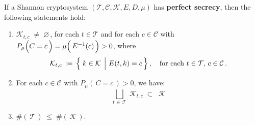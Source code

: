 \clearpage
\begin{proposition}
\mbox{}
\vskip 0.1cm
\noindent
If a Shannon cryptosystem
$(\mathcal{T},\mathcal{C},\mathcal{K},E,D,\mu)$
has \textbf{perfect secrecy}, then the following statements hold:
\begin{enumerate}
\item
	$\mathcal{K}_{t,c} \; \neq \; \varnothing$\,,
	for each $t \in \mathcal{T}$
	and
	for each $c \in \mathcal{C}$
	with $P_{\mu}\!\left(\overset{{\color{white}.}}{C}=c\,\right) =
	\mu\!\left(\,\overset{{\color{white}.}}{E^{-1}}(c)\,\right) > 0 $,
	where
	\begin{equation*}
	\mathcal{K}_{t,c} \, := \, \left\{\,\left. k \overset{{\color{white}.}}{\in} \mathcal{K} \;\,\right\vert\, E(t,k) = c\,\right\},
	\quad\textnormal{for each $t\in\mathcal{T}$, $c \in \mathcal{C}$}\,.
	\end{equation*}
\item
	For each $c \in \mathcal{C}$ with $P_{\mu}\!\left(\,C = c\,\right) > 0$, we have:
	\begin{equation*}
	\underset{t\,\in\,\mathcal{T}}{\bigsqcup}\; \mathcal{K}_{t,c}
	\; \subset \;\;
	\mathcal{K}
	\end{equation*}
\item
	$\#\!\left(\,\mathcal{T}\,\right) \; \leq \; \#\!\left(\,\mathcal{K}\,\right)$.
\end{enumerate}
\end{proposition}

